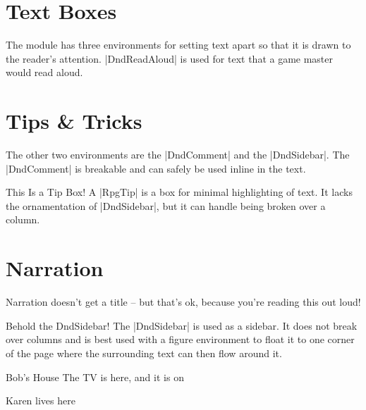 	\section{Text Boxes}

	The module has three environments for setting text apart so that it is drawn to the reader's attention. |DndReadAloud| is used for text that a game master would read aloud.
	\section{Tips \& Tricks}
	The other two environments are the |DndComment| and the |DndSidebar|. The |DndComment| is breakable and can safely be used inline in the text.

	\begin{RpgTip}{This Is a Tip Box!}
	A |RpgTip| is a box for minimal highlighting of text. It lacks the ornamentation of |DndSidebar|, but it can handle being broken over a column.
	\end{RpgTip}



	\section{Narration}

	\begin{RpgNarration}
		Narration doesn't get a title -- but that's ok, because you're reading this out loud!
	\end{RpgNarration}

	\begin{RpgSidebar}[]{Behold the DndSidebar!}
  The |DndSidebar| is used as a sidebar. It does not break over columns and is best used with a figure environment to float it to one corner of the page where the surrounding text can then flow around it.
\end{RpgSidebar}


		\begin{RpgMap*}[header-offset=0,title={RPG maps}]
			
			

			\begin{RpgNestedArea}[bob][prefix={Bob~}]{Bob's House}
				 The TV is here, and it is on
				\RpgArea[cot]{}
			\end{RpgNestedArea}

			 Karen lives here
			\RpgArea{}
		\end{RpgMap*}


